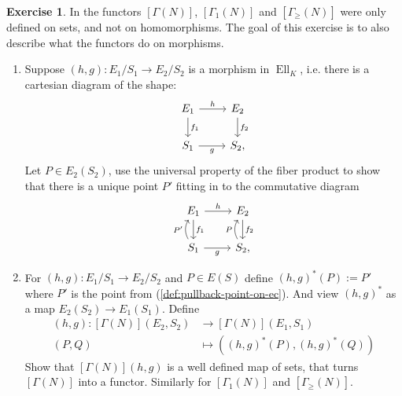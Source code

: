 \documentclass[a4paper,12pt,reqno]{amsart}
\makeatletter
\renewcommand{\listoftodos}[1][\@todonotes@todolistname]{%
	\@starttoc{tdo}{#1}}
\DeclareMathOperator{\Ell}{Ell}
\theoremstyle{definition}
\newtheorem{exercise}[lemma]{Exercise}
\numberwithin{lemma}{section}
\numberwithin{equation}{section}
\numberwithin{figure}{section}
\makeatother
\begin{document}
\begin{exercise}
In  the functors $[\Gamma(N)]$, $[\Gamma_1(N)]$ and $[\Gamma_\geq(N)]$ were only defined on sets, and not on homomorphisms.  The goal of this exercise is to also describe what the functors do on morphisms.
\begin{enumerate}
\item Suppose $(h,g): E_1/S_1 \to E_2/S_2$ is a morphism in $\Ell_K$, i.e. there is a cartesian diagram of the shape:
	\[
\begin{tikzcd}
E_1 \arrow[r,"h"] \arrow[d,"f_1"] & E_2 \arrow[d, "f_2"] \\
S_1 \arrow[r, "g"'] & S_2,
\end{tikzcd}
\]
Let $P \in E_2(S_2)$, use the universal property of the fiber product to show that there is a unique point $P'$ fitting in to the commutative diagram
	\[
\begin{tikzcd}
E_1 \arrow[r,"h"] \arrow[d,"f_1"] & E_2 \arrow[d, "f_2"] \\
S_1  \arrow[u, bend left,"P'"] \arrow[r, "g"'] & S_2 \arrow[u, bend left, "P"], \label{def:pullback-point-on-ec}
\end{tikzcd}
\]
\item For $(h,g): E_1/S_1 \to E_2/S_2$  and $P\in E(S)$ define  $(h,g)^*(P) := P'$ where $P'$ is the point from (\ref{def:pullback-point-on-ec}). And view $(h,g)^*$ as a map $E_2(S_2) \to E_1(S_1)$. Define 
\begin{align*}
[\Gamma(N)](h,g) : [\Gamma(N)](E_2,S_2) &\to [\Gamma(N)](E_1,S_1) \\
 (P,Q) &\mapsto ((h,g)^*(P),(h,g)^*(Q) )
\end{align*}
Show that $[\Gamma(N)](h,g)$ is a well defined map of sets, that turns $[\Gamma(N)]$ into a functor. Similarly for $[\Gamma_1(N)]$ and $[\Gamma_\geq(N)]$.
\end{enumerate}
\end{exercise}

\listoftodos


{}
\end{document}
